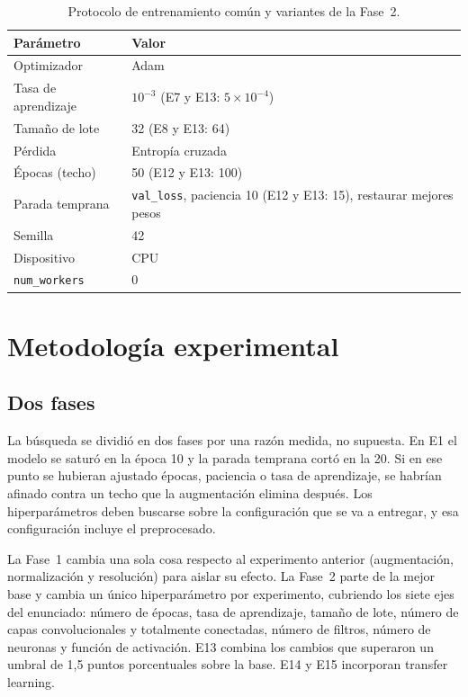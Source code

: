 \documentclass[11pt,a4paper]{article}
\begin{document}
\begin{table}[htbp]
\centering
\small
\caption{Protocolo de entrenamiento común y variantes de la Fase~2.}
\label{tab:entrenamiento}
\begin{tabular}{ll}
\toprule
Parámetro & Valor \\
\midrule
Optimizador & Adam \\
Tasa de aprendizaje & $10^{-3}$ (E7 y E13: $5\times10^{-4}$) \\
Tamaño de lote & 32 (E8 y E13: 64) \\
Pérdida & Entropía cruzada \\
Épocas (techo) & 50 (E12 y E13: 100) \\
Parada temprana & \texttt{val\_loss}, paciencia 10 (E12 y E13: 15), restaurar mejores pesos \\
Semilla & 42 \\
Dispositivo & CPU \\
\texttt{num\_workers} & 0 \\
\bottomrule
\end{tabular}
\end{table}

\section{Metodología experimental}

\subsection{Dos fases}

La búsqueda se dividió en dos fases por una razón medida, no supuesta. En E1 el modelo se saturó en la época 10 y la parada temprana cortó en la 20. Si en ese punto se hubieran ajustado épocas, paciencia o tasa de aprendizaje, se habrían afinado contra un techo que la augmentación elimina después. Los hiperparámetros deben buscarse sobre la configuración que se va a entregar, y esa configuración incluye el preprocesado.

La Fase~1 cambia una sola cosa respecto al experimento anterior (augmentación, normalización y resolución) para aislar su efecto. La Fase~2 parte de la mejor base y cambia un único hiperparámetro por experimento, cubriendo los siete ejes del enunciado: número de épocas, tasa de aprendizaje, tamaño de lote, número de capas convolucionales y totalmente conectadas, número de filtros, número de neuronas y función de activación. E13 combina los cambios que superaron un umbral de 1,5 puntos porcentuales sobre la base. E14 y E15 incorporan transfer learning.
\end{document}
